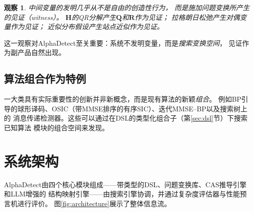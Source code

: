 \documentclass[12pt,a4paper]{article}
\newtheorem{observation}{观察}[section]
\newcommand{\bH}{\mathbf{H}}
\begin{document}
\begin{observation}
  中间变量的发明几乎从不是自由的创造性行为，
  而是施加问题变换所产生的\emph{见证}（witness）。
  $\bH$的QR分解产生$\mathbf{Q}$和$\mathbf{R}$作为见证；
  拉格朗日松弛产生对偶变量作为见证；
  近似分布假设产生站点近似作为见证。
\end{observation}

\noindent
这一观察对AlphaDetect至关重要：系统不发明变量，而是\emph{搜索变换空间}，
见证作为副产品自然出现。

\subsection{算法组合作为特例}

一大类具有实际重要性的创新并非新概念，而是现有算法的新颖\emph{组合}。
例如BP引导的球形译码、OSIC（带MMSE排序的有序SIC）、迭代MMSE--BP以及搜索树上的
消息传递检测器。这些可以通过在DSL的类型化组合子（第\ref{sec:dsl}节）下搜索已知算法
模块的组合空间来发现。

\section{系统架构}
\label{sec:architecture}

AlphaDetect由四个核心模块组成——带类型的DSL、问题变换库、CAS推导引擎和LLM增强的
结构映射引擎——由搜索引擎协调，并通过复杂度评估器与性能预言机进行评价。
图\ref{fig:architecture}展示了整体信息流。
\end{document}
